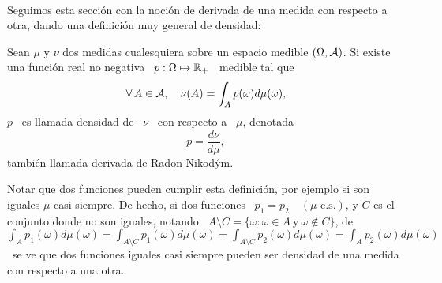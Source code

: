 \

Seguimos esta secci\'on con la noci\'on de derivada de una medida con respecto a
otra, dando una definici\'on muy general de densidad:
%
\begin{definicion}
\label{Def:MP:DensidadMedida}
%
  Sean  $\mu$  y  $\nu$  dos  medidas  cualesquiera  sobre  un  espacio  medible
  $(\Omega,\mathcal{A})$.  Si existe una funci\'on  real no negativa \ $p: \Omega \mapsto
  \mathbb{R}_+$ \ medible tal que
  \[
  \forall \, A \in \mathcal{A}, \quad \nu(A) = \int_A p(\omega) d\mu(\omega),
  \]
  $p$ \ es llamada densidad de \ $\nu$ \ con respecto a \ $\mu$, denotada
  \[
  p = \frac{d\nu}{d\mu},
  \]
  tambi\'en llamada derivada de Radon-Nikod\'ym.
\end{definicion}

Notar   que dos funciones pueden  cumplir esta definici\'on,  por ejemplo si
son  iguales $\mu$-casi siempre.
%
De hecho, si  dos funciones \ $p_1  = p_2 \quad (\mu\mbox{-c.s.})$, y  $C$ es el
conjunto donde no son iguales, notando \  $A \setminus C = \{ \omega: \omega \in
A \:  \mbox{y} \:  \omega \not\in C\}$,  de \ $\displaystyle  \int_A p_1(\omega)
d\mu(\omega) =  \int_{A\setminus C} p_1(\omega)  d\mu(\omega) = \int_{A\setminus
  C} p_2(\omega) d\mu(\omega) = \int_A p_2(\omega) d\mu(\omega)$ \ se ve que dos
funciones iguales casi siempre pueden ser  densidad de una medida con respecto a
una otra.

